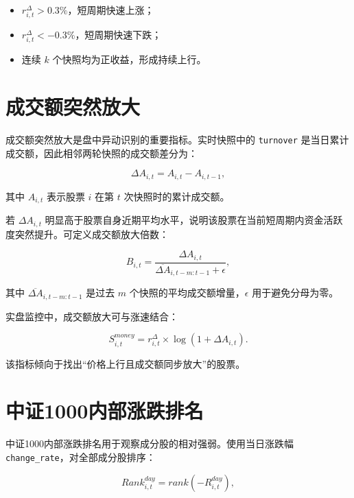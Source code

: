 \documentclass[UTF8,a4paper,12pt]{ctexart}
\begin{document}
\begin{itemize}
  \item $r_{i,t}^{\Delta} > 0.3\%$，短周期快速上涨；
  \item $r_{i,t}^{\Delta} < -0.3\%$，短周期快速下跌；
  \item 连续 $k$ 个快照均为正收益，形成持续上行。
\end{itemize}

\section{成交额突然放大}

成交额突然放大是盘中异动识别的重要指标。实时快照中的 \texttt{turnover} 是当日累计成交额，因此相邻两轮快照的成交额差分为：

\begin{equation}
\Delta A_{i,t} = A_{i,t} - A_{i,t-1},
\end{equation}

其中 $A_{i,t}$ 表示股票 $i$ 在第 $t$ 次快照时的累计成交额。

若 $\Delta A_{i,t}$ 明显高于股票自身近期平均水平，说明该股票在当前短周期内资金活跃度突然提升。可定义成交额放大倍数：

\begin{equation}
B_{i,t} = \frac{\Delta A_{i,t}}{\overline{\Delta A}_{i,t-m:t-1} + \epsilon},
\end{equation}

其中 $\overline{\Delta A}_{i,t-m:t-1}$ 是过去 $m$ 个快照的平均成交额增量，$\epsilon$ 用于避免分母为零。

实盘监控中，成交额放大可与涨速结合：

\begin{equation}
S_{i,t}^{money} = r_{i,t}^{\Delta} \times \log(1 + \Delta A_{i,t}).
\end{equation}

该指标倾向于找出“价格上行且成交额同步放大”的股票。

\section{中证1000内部涨跌排名}

中证1000内部涨跌排名用于观察成分股的相对强弱。使用当日涨跌幅 \texttt{change\_rate}，对全部成分股排序：

\begin{equation}
Rank_{i,t}^{day} = rank(-R_{i,t}^{day}),
\end{equation}
\end{document}
